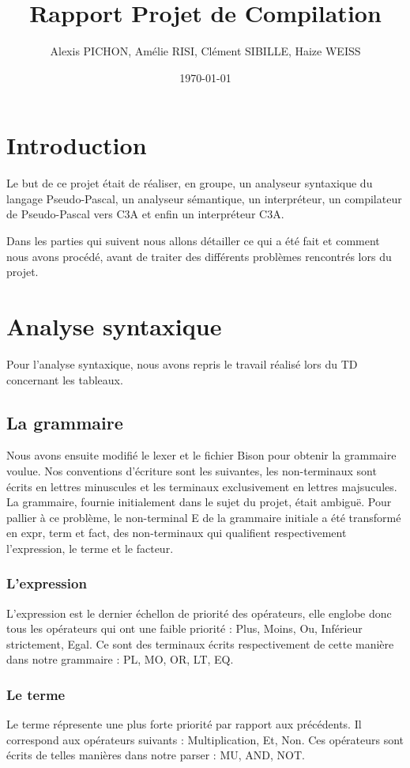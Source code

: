 \documentclass[11pt,a4paper]{article}
\title{Rapport Projet de Compilation}
\author{Alexis PICHON, Amélie RISI, Clément SIBILLE, Haize WEISS}
\date{\today}
\begin{document}
\maketitle
\pagebreak
\tableofcontents
\pagebreak

\setlength{\parskip}{1em}
\setlength{\intextsep}{2em}


\section{Introduction}
Le but de ce projet était de réaliser, en groupe, un analyseur syntaxique du langage Pseudo-Pascal, un analyseur sémantique, un interpréteur, un compilateur de Pseudo-Pascal vers C3A et enfin un interpréteur C3A.
\par
Dans les parties qui suivent nous allons détailler ce qui a été fait et comment nous avons procédé, avant de traiter des différents problèmes rencontrés lors du projet.


\section{Analyse syntaxique}
Pour l'analyse syntaxique, nous avons repris le travail réalisé lors du TD concernant les tableaux. 

\subsection{La grammaire}
Nous avons ensuite modifié le lexer et le fichier Bison pour obtenir la grammaire voulue. Nos conventions d'écriture sont les suivantes, les non-terminaux sont écrits en lettres minuscules et les terminaux exclusivement en lettres majsucules. 
La grammaire, fournie initialement dans le sujet du projet, était ambiguë. Pour pallier à ce problème, le non-terminal E de la grammaire initiale a été transformé en expr, term et fact, des non-terminaux qui qualifient respectivement l'expression, le terme et le facteur. 
\subsubsection{L'expression}
L'expression est le dernier échellon de priorité des opérateurs, elle englobe donc tous les opérateurs qui ont une faible priorité : Plus, Moins, Ou, Inférieur strictement, Egal. 
Ce sont des terminaux écrits respectivement de cette manière dans notre grammaire : PL, MO, OR, LT, EQ.
\subsubsection{Le terme}
Le terme répresente une plus forte priorité par rapport aux précédents. Il correspond aux opérateurs suivants : Multiplication, Et, Non.
Ces opérateurs sont écrits de telles manières dans notre parser : MU, AND, NOT.  
\end{document}
